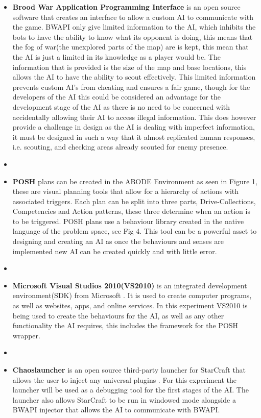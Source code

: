 \documentclass[journal]{IEEEtran}
\begin{document}
\begin{itemize}
	\item \textbf{Brood War Application Programming Interface} \cite{BWAPI} is an open source software that creates an interface to allow a custom AI to communicate with the game. BWAPI only give limited information to the AI, which inhibits the bots to have the ability to know what its opponent is doing, this means that the fog of war(the unexplored parts of the map) are is kept\cite{POSH}, this mean that the AI is just a limited in its knowledge as a player would be. The information that is provided is the size of the map and base locations, this allows the AI to have the ability to scout effectively. This limited information prevents custom AI's from cheating and ensures a fair game, though for the developers of the AI this could be considered an advantage for the development stage of the AI as there is no need to be concerned with accidentally allowing their AI to access illegal information. This does however provide a challenge in design as the AI is dealing with imperfect information, it must be designed in such a way that it almost replicated human responses, i.e. scouting, and checking areas already scouted for enemy presence.
	\item[]
	\item \textbf{POSH} plans can be created in the ABODE Environment as seen in Figure 1, these are visual planning tools that allow for a hierarchy of actions with associated triggers. Each plan can be split into three parts, Drive-Collections, Competencies and Action patterns, these three determine when an action is to be triggered. POSH plans use a behaviour library created in the native language of the problem space, see Fig 4. This tool can be a powerful asset to designing and creating an AI as once the behaviours and senses are implemented new AI can be created quickly and with little error.
	\item[]
	\item \textbf{Microsoft Visual Studios 2010(VS2010)} is an integrated development environment(SDK) from Microsoft \cite{Visual}. It is used to create computer programs, as well as websites, apps, and online services. In this experiment VS2010 is being used to create the behaviours for the AI, as well as any other functionality the AI requires, this includes the framework for the POSH wrapper.
	\item[]
	\item \textbf{Chaoslauncher} is an open source third-party launcher for StarCraft that allows the user to inject any universal plugins \cite{Chaos}. For this experiment the launcher will be used as a debugging tool for the first stages of the AI. The launcher also allows StarCraft to be run in windowed mode alongside a BWAPI injector that allows the AI to communicate with BWAPI.	

\end{itemize}
\end{document}
